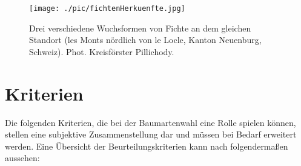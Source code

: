 \documentclass[twocolumn]{scrartcl}
\begin{document}
\begin{figure}[htbp]
  \centering
  \texttt{[image: ./pic/fichtenHerkuenfte.jpg]}
  \caption{Drei verschiedene Wuchsformen von Fichte an dem gleichen
    Standort (les Monts nördlich von le Locle, Kanton Neuenburg,
    Schweiz). Phot. Kreisförster
    Pillichody. \citep[S.~86]{hegi1906IllustrierteFloraBd1}}
  \label{fig:fichtenHerkuenfte}
\end{figure}

\section{Kriterien}
\label{sec:kriterien}

Die folgenden Kriterien, die bei der Baumartenwahl eine Rolle spielen
können, stellen eine subjektive Zusammenstellung dar und müssen bei
Bedarf erweitert werden. Eine Übersicht der Beurteilungskriterien kann
nach \citet[Bd.1, S.108]{bauer1962WaldbauAlsWissenschaft}
folgendermaßen aussehen:
\end{document}
